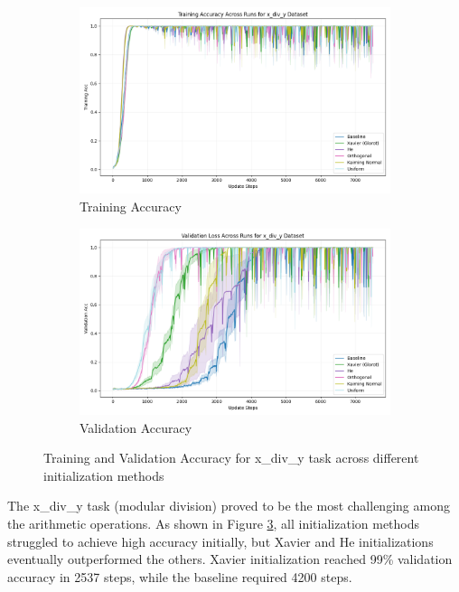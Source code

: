 \documentclass{article} %
\begin{document}
\begin{figure}[h]
    \centering
    \begin{subfigure}{0.49\textwidth}
        \includegraphics[width=\textwidth]{train_acc_x_div_y.png}
        \caption{Training Accuracy}
        \label{fig:train_acc_x_div_y}
    \end{subfigure}
    \hfill
    \begin{subfigure}{0.49\textwidth}
        \includegraphics[width=\textwidth]{val_acc_x_div_y.png}
        \caption{Validation Accuracy}
        \label{fig:val_acc_x_div_y}
    \end{subfigure}
    \caption{Training and Validation Accuracy for x\_div\_y task across different initialization methods}
    \label{fig:acc_x_div_y}
\end{figure}

The x\_div\_y task (modular division) proved to be the most challenging among the arithmetic operations. As shown in Figure \ref{fig:acc_x_div_y}, all initialization methods struggled to achieve high accuracy initially, but Xavier and He initializations eventually outperformed the others. Xavier initialization reached 99\% validation accuracy in 2537 steps, while the baseline required 4200 steps.
\end{document}
